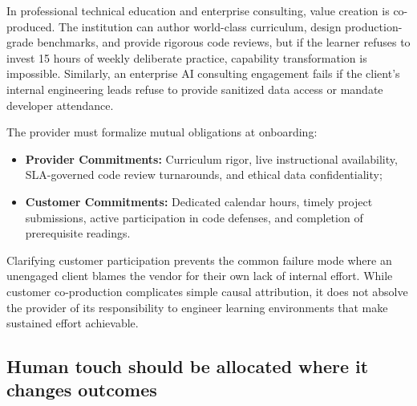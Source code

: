 In professional technical education and enterprise consulting, value creation is co-produced. The institution can author world-class curriculum, design production-grade benchmarks, and provide rigorous code reviews, but if the learner refuses to invest 15 hours of weekly deliberate practice, capability transformation is impossible. Similarly, an enterprise AI consulting engagement fails if the client's internal engineering leads refuse to provide sanitized data access or mandate developer attendance.

The provider must formalize mutual obligations at onboarding:
\begin{itemize}
\item \textbf{Provider Commitments:} Curriculum rigor, live instructional availability, SLA-governed code review turnarounds, and ethical data confidentiality;
\item \textbf{Customer Commitments:} Dedicated calendar hours, timely project submissions, active participation in code defenses, and completion of prerequisite readings.
\end{itemize}
Clarifying customer participation prevents the common failure mode where an unengaged client blames the vendor for their own lack of internal effort. While customer co-production complicates simple causal attribution, it does not absolve the provider of its responsibility to engineer learning environments that make sustained effort achievable.

\subsection{Human touch should be allocated where it changes outcomes}

